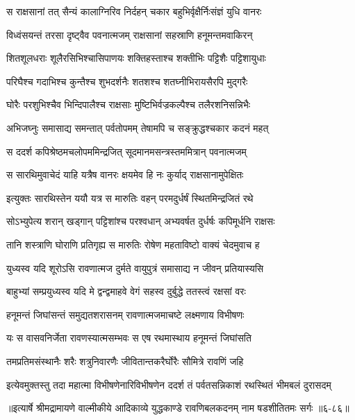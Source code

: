 \twolineshloka
{स राक्षसानां तत् सैन्यं कालाग्निरिव निर्दहन्}
{चकार बहुभिर्वृक्षैर्निःसंज्ञं युधि वानरः} %

\twolineshloka
{विध्वंसयन्तं तरसा दृष्ट्वैव पवनात्मजम्}
{राक्षसानां सहस्राणि हनूमन्तमवाकिरन्} %

\twolineshloka
{शितशूलधराः शूलैरसिभिश्चासिपाणयः}
{शक्तिहस्ताश्च शक्तीभिः पट्टिशैः पट्टिशायुधाः} %

\twolineshloka
{परिघैश्च गदाभिश्च कुन्तैश्च शुभदर्शनैः}
{शतशश्च शतघ्नीभिरायसैरपि मुद्गरैः} %

\twolineshloka
{घोरैः परशुभिश्चैव भिन्दिपालैश्च राक्षसाः}
{मुष्टिभिर्वज्रकल्पैश्च तलैरशनिसन्निभैः} %

\twolineshloka
{अभिजघ्नुः समासाद्य समन्तात् पर्वतोपमम्}
{तेषामपि च सङ्क्रुद्धश्चकार कदनं महत्} %

\twolineshloka
{स ददर्श कपिश्रेष्ठमचलोपममिन्द्रजित्}
{सूदमानमसन्त्रस्तममित्रान् पवनात्मजम्} %

\twolineshloka
{स सारथिमुवाचेदं याहि यत्रैष वानरः}
{क्षयमेव हि नः कुर्याद् राक्षसानामुपेक्षितः} %

\twolineshloka
{इत्युक्तः सारथिस्तेन ययौ यत्र स मारुतिः}
{वहन् परमदुर्धर्षं स्थितमिन्द्रजितं रथे} %

\twolineshloka
{सोऽभ्युपेत्य शरान् खड्गान् पट्टिशांश्च परश्वधान्}
{अभ्यवर्षत दुर्धर्षः कपिमूर्धनि राक्षसः} %

\twolineshloka
{तानि शस्त्राणि घोराणि प्रतिगृह्य स मारुतिः}
{रोषेण महताविष्टो वाक्यं चेदमुवाच ह} %

\twolineshloka
{युध्यस्व यदि शूरोऽसि रावणात्मज दुर्मते}
{वायुपुत्रं समासाद्य न जीवन् प्रतियास्यसि} %

\twolineshloka
{बाहुभ्यां सम्प्रयुध्यस्व यदि मे द्वन्द्वमाहवे}
{वेगं सहस्व दुर्बुद्धे ततस्त्वं रक्षसां वरः} %

\twolineshloka
{हनूमन्तं जिघांसन्तं समुद्यतशरासनम्}
{रावणात्मजमाचष्टे लक्ष्मणाय विभीषणः} %

\twolineshloka
{यः स वासवनिर्जेता रावणस्यात्मसम्भवः}
{स एष रथमास्थाय हनूमन्तं जिघांसति} %

\twolineshloka
{तमप्रतिमसंस्थानैः शरैः शत्रुनिवारणैः}
{जीवितान्तकरैर्घोरैः सौमित्रे रावणिं जहि} %

\twolineshloka
{इत्येवमुक्तस्तु तदा महात्मा विभीषणेनारिविभीषणेन}
{ददर्श तं पर्वतसन्निकाशं रथस्थितं भीमबलं दुरासदम्} %


॥इत्यार्षे श्रीमद्रामायणे वाल्मीकीये आदिकाव्ये युद्धकाण्डे रावणिबलकदनम् नाम षडशीतितमः सर्गः ॥६-८६॥
